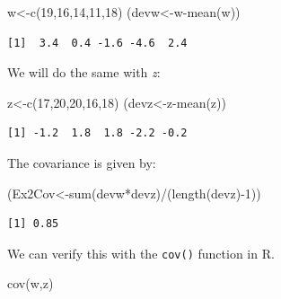 \documentclass[
  letterpaper,
  DIV=11,
  numbers=noendperiod]{scrreprt}
\newenvironment{Shaded}{\begin{snugshade}}{\end{snugshade}}
\newcommand{\DecValTok}[1]{\textcolor[rgb]{0.68,0.00,0.00}{#1}}
\newcommand{\FunctionTok}[1]{\textcolor[rgb]{0.28,0.35,0.67}{#1}}
\newcommand{\NormalTok}[1]{\textcolor[rgb]{0.00,0.23,0.31}{#1}}
\newcommand{\OtherTok}[1]{\textcolor[rgb]{0.00,0.23,0.31}{#1}}
\newcommand{\SpecialCharTok}[1]{\textcolor[rgb]{0.37,0.37,0.37}{#1}}
\begin{document}
\begin{Shaded}
\begin{Highlighting}[numbers=left,,]
\NormalTok{w}\OtherTok{\textless{}{-}}\FunctionTok{c}\NormalTok{(}\DecValTok{19}\NormalTok{,}\DecValTok{16}\NormalTok{,}\DecValTok{14}\NormalTok{,}\DecValTok{11}\NormalTok{,}\DecValTok{18}\NormalTok{)}
\NormalTok{(devw}\OtherTok{\textless{}{-}}\NormalTok{w}\SpecialCharTok{{-}}\FunctionTok{mean}\NormalTok{(w))}
\end{Highlighting}
\end{Shaded}

\begin{verbatim}
[1]  3.4  0.4 -1.6 -4.6  2.4
\end{verbatim}

We will do the same with \emph{z}:

\begin{Shaded}
\begin{Highlighting}[numbers=left,,]
\NormalTok{z}\OtherTok{\textless{}{-}}\FunctionTok{c}\NormalTok{(}\DecValTok{17}\NormalTok{,}\DecValTok{20}\NormalTok{,}\DecValTok{20}\NormalTok{,}\DecValTok{16}\NormalTok{,}\DecValTok{18}\NormalTok{)}
\NormalTok{(devz}\OtherTok{\textless{}{-}}\NormalTok{z}\SpecialCharTok{{-}}\FunctionTok{mean}\NormalTok{(z))}
\end{Highlighting}
\end{Shaded}

\begin{verbatim}
[1] -1.2  1.8  1.8 -2.2 -0.2
\end{verbatim}

The covariance is given by:

\begin{Shaded}
\begin{Highlighting}[numbers=left,,]
\NormalTok{(Ex2Cov}\OtherTok{\textless{}{-}}\FunctionTok{sum}\NormalTok{(devw}\SpecialCharTok{*}\NormalTok{devz)}\SpecialCharTok{/}\NormalTok{(}\FunctionTok{length}\NormalTok{(devz)}\SpecialCharTok{{-}}\DecValTok{1}\NormalTok{))}
\end{Highlighting}
\end{Shaded}

\begin{verbatim}
[1] 0.85
\end{verbatim}

We can verify this with the \texttt{cov()} function in R.

\begin{Shaded}
\begin{Highlighting}[numbers=left,,]
\FunctionTok{cov}\NormalTok{(w,z)}
\end{Highlighting}
\end{Shaded}
\end{document}
